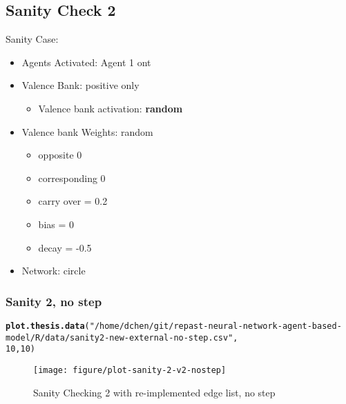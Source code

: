\documentclass{article}\usepackage[]{graphicx}\usepackage[]{color}
\makeatletter
\def\maxwidth{ %
  \ifdim\Gin@nat@width>\linewidth
    \linewidth
  \else
    \Gin@nat@width
  \fi
}
\newcommand{\hlnum}[1]{\textcolor[rgb]{0.686,0.059,0.569}{#1}}%
\newcommand{\hlstr}[1]{\textcolor[rgb]{0.192,0.494,0.8}{#1}}%
\newcommand{\hlstd}[1]{\textcolor[rgb]{0.345,0.345,0.345}{#1}}%
\newcommand{\hlkwd}[1]{\textcolor[rgb]{0.737,0.353,0.396}{\textbf{#1}}}%
\newenvironment{kframe}{%
 \def\at@end@of@kframe{}%
 \ifinner\ifhmode%
  \def\at@end@of@kframe{\end{minipage}}%
  \begin{minipage}{\columnwidth}%
 \fi\fi%
 \def\FrameCommand##1{\hskip\@totalleftmargin \hskip-\fboxsep
 \colorbox{shadecolor}{##1}\hskip-\fboxsep
     \hskip-\linewidth \hskip-\@totalleftmargin \hskip\columnwidth}%
 \MakeFramed {\advance\hsize-\width
   \@totalleftmargin\z@ \linewidth\hsize
   \@setminipage}}%
 {\par\unskip\endMakeFramed%
 \at@end@of@kframe}
\newenvironment{knitrout}{}{} %
\makeatother
\begin{document}
\newpage
\subsection{Sanity Check 2}
\label{sec:sanity2}
Sanity Case:
\begin{itemize}
  \item Agents Activated: Agent 1 ont
  \item Valence Bank: positive only
  \begin{itemize}
      \item Valence bank activation: \textbf{random}
  \end{itemize}
  \item Valence bank Weights: random
  \begin{itemize}
      \item opposite 0
      \item corresponding 0
      \item carry over = 0.2
      \item bias = 0
      \item decay = -0.5
  \end{itemize}
  \item Network: circle
\end{itemize}
%
%

\newpage
\subsubsection{Sanity 2, no step}
\begin{knitrout}
\color{fgcolor}\begin{kframe}
\begin{alltt}
\hlkwd{plot.thesis.data}\hlstd{(}\hlstr{"/home/dchen/git/repast-neural-network-agent-based-model/R/data/sanity2-new-external-no-step.csv"}\hlstd{,}
    \hlnum{10}\hlstd{,} \hlnum{10}\hlstd{)}
\end{alltt}
\end{kframe}\begin{figure}[]

\texttt{[image: figure/plot-sanity-2-v2-nostep]} \caption[Sanity Checking 2 with re-implemented edge list, no step]{Sanity Checking 2 with re-implemented edge list, no step\label{fig:plot-sanity-2-v2-nostep}}
\end{figure}


\end{knitrout}
\end{document}
